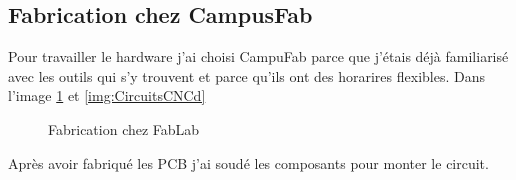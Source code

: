 \documentclass[12pt]{article}
\begin{document}
\subsection{Fabrication chez CampusFab}
\begin{par}
	Pour travailler le hardware j'ai choisi CampuFab parce que j'\'etais d\'ej\`a
	familiaris\'e avec les outils qui s'y trouvent et parce qu'ils ont des horarires
	flexibles. Dans l'image \ref{img:CampusFab}
	et \ref{img:CircuitsCNCd}
\end{par}

\begin{figure}[!htb]
	\centering
	\caption{Fabrication chez FabLab}
	\label{img:CampusFab}
\end{figure}



\begin{par}
	Apr\`es avoir fabriqu\'e les PCB j'ai soud\'e les composants pour monter le
	circuit.
\end{par}
\end{document}
